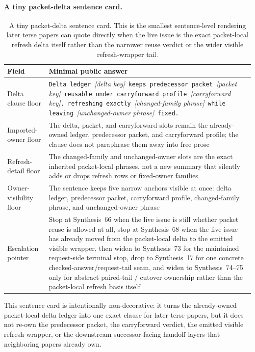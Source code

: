 \documentclass[11pt]{article}
\begin{document}
\paragraph{A tiny packet-delta sentence card.}
\begin{table}[t]
\centering
\small
\begin{tabularx}{\linewidth}{@{}lX@{}}
\toprule
Field & Minimal public answer \\
\midrule
Delta clause floor & \texttt{Delta ledger }\emph{[delta key]}\texttt{ keeps predecessor packet }\emph{[packet key]}\texttt{ reusable under carryforward profile }\emph{[carryforward key]}\texttt{, refreshing exactly }\emph{[changed-family phrase]}\texttt{ while leaving }\emph{[unchanged-owner phrase]}\texttt{ fixed.} \\
Imported-owner floor & The delta, packet, and carryforward slots remain the already-owned ledger, predecessor packet, and carryforward profile; the clause does not paraphrase them away into free prose \\
Refresh-detail floor & The changed-family and unchanged-owner slots are the exact inherited packet-local phrases, not a new summary that silently adds or drops refresh rows or fixed-owner families \\
Owner-visibility floor & The sentence keeps five narrow anchors visible at once: delta ledger, predecessor packet, carryforward profile, changed-family phrase, and unchanged-owner phrase \\
Escalation pointer & Stop at Synthesis~66 when the live issue is still whether packet reuse is allowed at all, stop at Synthesis~68 when the live issue has already moved from the packet-local delta to the emitted visible wrapper, then widen to Synthesis~73 for the maintained request-side terminal stop, drop to Synthesis~17 for one concrete checked-answer/request-tail seam, and widen to Synthesis~74--75 only for abstract paired-tail / cutover ownership rather than the packet-local refresh basis itself \\
\bottomrule
\end{tabularx}
\caption{A tiny packet-delta sentence card. This is the smallest sentence-level rendering later terse papers can quote directly when the live issue is the exact packet-local refresh delta itself rather than the narrower reuse verdict or the wider visible refresh-wrapper tail.}
\label{tab:tiny-packet-delta-sentence-card}
\end{table}

This sentence card is intentionally non-decorative: it turns the already-owned packet-local delta ledger into one exact clause for later terse papers, but it does not re-own the predecessor packet, the carryforward verdict, the emitted visible refresh wrapper, or the downstream successor-facing handoff layers that neighboring papers already own.\cite{series:workedexample}
\end{document}
